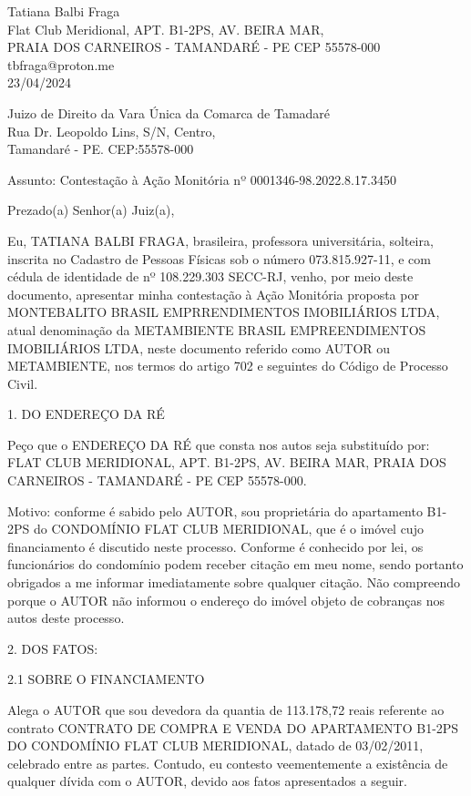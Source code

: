 \documentclass[11pt]{letter}
\begin{document}

Tatiana Balbi Fraga \\
Flat Club Meridional, APT. B1-2PS, AV. BEIRA MAR,  \\
PRAIA DOS CARNEIROS - TAMANDARÉ - PE CEP 55578-000 \\
tbfraga@proton.me \\

23/04/2024

Juizo de Direito da Vara Única da Comarca de Tamadaré \\
Rua Dr. Leopoldo Lins, S/N, Centro, \\
Tamandaré - PE. CEP:55578-000

Assunto: Contestação à Ação Monitória nº 0001346-98.2022.8.17.3450

Prezado(a) Senhor(a) Juiz(a),

Eu, TATIANA BALBI FRAGA,
brasileira, professora universitária, solteira, inscrita no Cadastro de Pessoas Físicas sob o número 073.815.927-11, e com cédula de identidade de nº 108.229.303 SECC-RJ, venho, por meio deste documento, apresentar minha contestação à Ação Monitória proposta por MONTEBALITO BRASIL EMPRRENDIMENTOS IMOBILIÁRIOS LTDA, atual
denominação da METAMBIENTE BRASIL EMPREENDIMENTOS IMOBILIÁRIOS LTDA, neste documento referido como AUTOR ou METAMBIENTE, nos termos do artigo 702 e seguintes do Código de Processo Civil.

1. DO ENDEREÇO DA RÉ

Peço que o ENDEREÇO DA RÉ que consta nos autos seja substituído por: FLAT CLUB MERIDIONAL, APT. B1-2PS, AV. BEIRA MAR, PRAIA DOS CARNEIROS - TAMANDARÉ - PE CEP 55578-000. 

Motivo: conforme é sabido pelo AUTOR, sou proprietária do apartamento B1-2PS do CONDOMÍNIO FLAT CLUB MERIDIONAL, que é o imóvel cujo financiamento é discutido neste processo. Conforme é conhecido por lei, os funcionários do condomínio podem receber citação em meu nome, sendo portanto obrigados a me informar imediatamente sobre qualquer citação. Não compreendo porque o AUTOR não informou o endereço do imóvel objeto de cobranças nos autos deste processo. 

2. DOS FATOS:

2.1 SOBRE O FINANCIAMENTO

Alega o AUTOR que sou devedora da quantia de 113.178,72 reais referente ao contrato CONTRATO DE COMPRA E VENDA DO APARTAMENTO B1-2PS DO CONDOMÍNIO FLAT CLUB MERIDIONAL, datado de 03/02/2011, celebrado entre as partes. Contudo, eu contesto veementemente a existência de qualquer dívida com o AUTOR, devido aos fatos apresentados a seguir.
\end{document}

